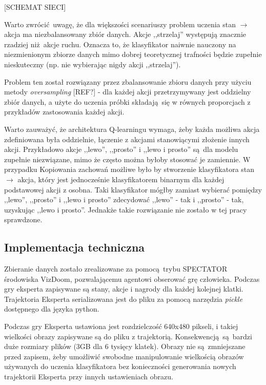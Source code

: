 [SCHEMAT SIECI]

Warto zwrócić uwagę, że dla większości scenariuszy problem uczenia stan $\to$ akcja ma niezbalansowany zbiór danych. Akcje ,,strzelaj'' występują znacznie rzadziej niż akcje ruchu. Oznacza to, że klasyfikator naiwnie nauczony na niezmienionym zbiorze danych mimo dobrej teoretycznej trafności będzie zupełnie nieskuteczny (np. nie wybierając nigdy akcji ,,strzelaj'').

Problem ten został rozwiązany przez zbalansowanie zbioru danych przy użyciu metody \textit{oversampling} [REF?] - dla każdej akcji przetrzymywany jest oddzielny zbiór danych, a użyte do uczenia próbki składają się w równych proporcjach z przykładów zastosowania każdej akcji. 

Warto zauważyć, że architektura Q-learningu wymaga, żeby każda możliwa akcja zdefiniowana była oddzielnie, łączenie z akcjami stanowiącymi złożenie innych akcji. Przykładowo akcje ,,lewo'', ,,prosto'' i ,,lewo i prosto'' są dla modelu zupełnie niezwiązane, mimo że często można byłoby stosować je zamiennie. W przypadku Kopiowania zachowań możliwe było by stworzenie klasyfikatora  stan $\to$ akcja, który jest jednocześnie klasyfikatorem binarnym dla każdej podstawowej akcji z osobna. Taki klasyfikator mógłby zamiast wybierać pomiędzy ,,lewo'', ,,prosto'' i ,,lewo i prosto'' zdecydować ,,lewo'' - tak i ,,prosto'' - tak, uzyskując ,,lewo i prosto''. Jednakże takie rozwiązanie nie zostało w tej pracy sprawdzone.

\subsection{Implementacja techniczna}

Zbieranie danych zostało zrealizowane za pomocą trybu SPECTATOR środowiska VizDoom, pozwalającemu agentowi obserować grę człowieka. Podczas gry eksperta zapisywane są stany, akcje i nagrody dla każdej kolejnej klatki. Trajektoria Eksperta serializowana jest do pliku za pomocą narzędzia \textit{pickle} dostępnego dla języka python.

Podczas gry Eksperta ustawiona jest rozdzielczość 640x480 pikseli, i takiej wielkości obrazy zapisywane są do pliku z trajektorią. Konsekwencją są bardzi duże rozmiary plików (3GB dla 6 tysięcy klatek). Obrazy nie są zmniejszane przed zapisem, żeby umożliwić swobodne manipulowanie wielkością obrazów używanych do uczenia klasyfikatora bez konieczności generowania nowych trajektorii Eksperta przy innych ustawieniach obrazu.

